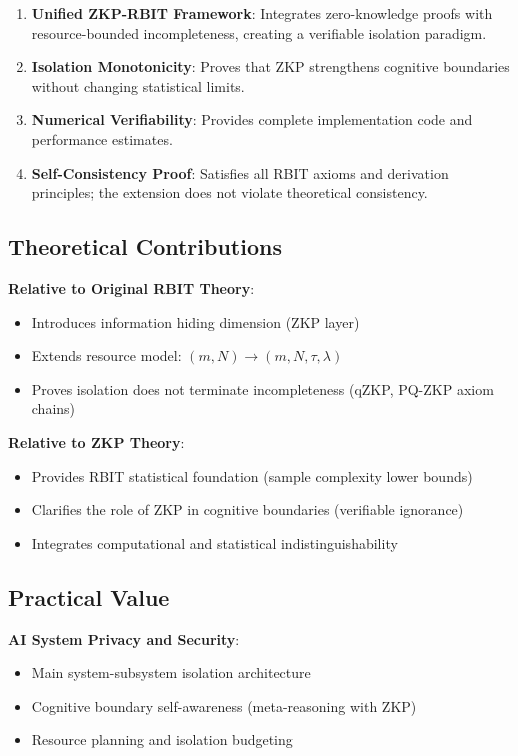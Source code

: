 \documentclass[12pt]{article}
\theoremstyle{plain}
\theoremstyle{definition}
\begin{document}
\begin{enumerate}
\item \textbf{Unified ZKP-RBIT Framework}: Integrates zero-knowledge proofs with resource-bounded incompleteness, creating a verifiable isolation paradigm.
\item \textbf{Isolation Monotonicity}: Proves that ZKP strengthens cognitive boundaries without changing statistical limits.
\item \textbf{Numerical Verifiability}: Provides complete implementation code and performance estimates.
\item \textbf{Self-Consistency Proof}: Satisfies all RBIT axioms and derivation principles; the extension does not violate theoretical consistency.
\end{enumerate}

\subsection{Theoretical Contributions}

\textbf{Relative to Original RBIT Theory}:
\begin{itemize}
\item Introduces information hiding dimension (ZKP layer)
\item Extends resource model: $(m, N) \to (m, N, \tau, \lambda)$
\item Proves isolation does not terminate incompleteness (qZKP, PQ-ZKP axiom chains)
\end{itemize}

\textbf{Relative to ZKP Theory}:
\begin{itemize}
\item Provides RBIT statistical foundation (sample complexity lower bounds)
\item Clarifies the role of ZKP in cognitive boundaries (verifiable ignorance)
\item Integrates computational and statistical indistinguishability
\end{itemize}

\subsection{Practical Value}

\textbf{AI System Privacy and Security}:
\begin{itemize}
\item Main system-subsystem isolation architecture
\item Cognitive boundary self-awareness (meta-reasoning with ZKP)
\item Resource planning and isolation budgeting
\end{itemize}
\end{document}

